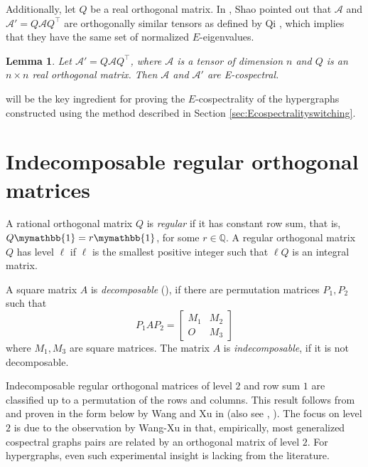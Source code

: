 \documentclass[12pt]{article}
\numberwithin{equation}{section}
\newtheorem{lemma}[theorem]{Lemma}
\theoremstyle{definition}
\newcommand{\Q}{\mathbb{Q}}
\begin{document}
Additionally, let $Q$ be a real orthogonal matrix. In \cite{shao}, Shao pointed out that $\mathcal{A}$ and $\mathcal{A}'=Q\mathcal{A}Q^\top$ are orthogonally similar tensors as defined by Qi \cite{Q2005}, which implies that they have the same set of normalized $E$-eigenvalues. 

\begin{lemma}\label{l.ortho} Let $\mathcal{A}' = Q\mathcal{A}Q^\top$, where $\mathcal{A}$ is a tensor of dimension $n$ and $Q$ is an $n\times n$ real orthogonal matrix. Then $\mathcal{A}$ and $\mathcal{A}'$ are E-cospectral.
\end{lemma}

 will be the key ingredient for proving the $E$-cospectrality of the hypergraphs constructed using the method described in Section \ref{sec:Ecospectralityswitching}.

\section{Indecomposable regular orthogonal matrices}
\label{sec:indecomp}
A rational orthogonal matrix $Q$ is \textit{regular} if it has constant row sum, that is, $Q\mymathbb{1} = r \mymathbb{1}$, for some $r \in \Q$. A regular orthogonal matrix $Q$ has level $\ell$ if $\ell$ is the smallest positive integer such that $\ell Q$ is an integral matrix.

A square matrix $A$ is \textit{decomposable} (\cite{wang_xu_2006,wang_xu_2010, brualdi_ryser_1991}), if there are permutation matrices $P_1, P_2$ such that 
$$
P_1 A P_2 = \begin{bmatrix} M_1 & M_2 \\ O & M_3 \end{bmatrix}
$$ 
where $M_1,M_3$ are square matrices. The matrix $A$ is \textit{indecomposable}, if it is not decomposable. 

Indecomposable regular orthogonal matrices of level $2$ and row sum $1$ are classified up to a permutation of the rows and columns. This result follows from \cite{chan_rodger_seberry} and proven in the form below by Wang and Xu in \cite[Theorem 3.1, p.~66]{wang_xu_2006} (also see \cite[Theorem 2.4, p.~73]{wang_xu_2010}, \cite[Theorem 3, p.~5]{abiad_berg_simoens}).  The focus on level $2$ is due to the observation by Wang-Xu in \cite{wang_xu_2010} that, empirically, most generalized cospectral graphs pairs are related by an orthogonal matrix of level $2$.  For hypergraphs, even such experimental insight is lacking from the literature.
\end{document}

